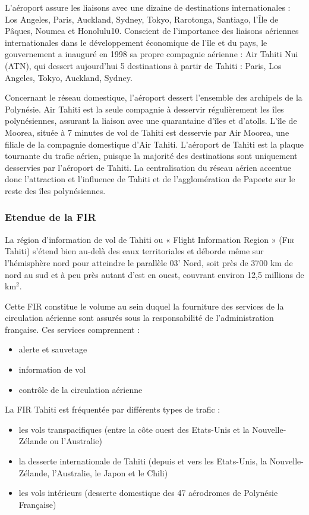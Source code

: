 L’aéroport assure les liaisons avec une dizaine de destinations internationales : Los Angeles, Paris, Auckland, Sydney, Tokyo, Rarotonga, Santiago, l’Île de Pâques, Noumea et Honolulu10. Conscient de l’importance des liaisons aériennes internationales dans le développement économique de l’île et du pays, le gouvernement a inauguré en 1998 sa propre compagnie aérienne : Air Tahiti Nui (ATN), qui dessert aujourd’hui 5 destinations à partir de Tahiti : Paris, Los Angeles, Tokyo, Auckland, Sydney.

Concernant le réseau domestique, l’aéroport dessert l’ensemble des archipels de la Polynésie. Air Tahiti est la seule compagnie à desservir régulièrement les îles polynésiennes, assurant la liaison avec une quarantaine d’îles et d’atolls. L’île de Moorea, située à 7 minutes de vol de Tahiti est desservie par Air Moorea, une filiale de la compagnie domestique d’Air Tahiti. L’aéroport de Tahiti est la plaque tournante du trafic aérien, puisque la majorité des destinations sont uniquement desservies par l’aéroport de Tahiti. La centralisation du réseau aérien accentue donc l’attraction et l’influence de Tahiti et de l’agglomération de Papeete sur le reste des îles polynésiennes.

        \subsubsection{Etendue de la \textsc{FIR}\label{Fir}}
La région d'information de vol de Tahiti ou « Flight Information Region » (\textsc{Fir} Tahiti) s'étend bien au-delà des eaux territoriales et déborde même sur l'hémisphère nord pour atteindre le parallèle 03' Nord, soit près de 3700 km de nord au sud et à peu près autant d'est en ouest, couvrant environ 12,5 millions de km$^2$.

Cette FIR constitue le volume au sein duquel la fourniture des services de la circulation aérienne sont assurés sous la responsabilité de l'administration française. Ces services comprennent :
\begin{itemize}
    \item alerte et sauvetage
    \item information de vol
    \item contrôle de la circulation aérienne
\end{itemize}\medskip
La FIR Tahiti est fréquentée par différents types de trafic :
\begin{itemize}
    \item les vols transpacifiques (entre la côte ouest des Etats-Unis et la Nouvelle-Zélande ou l'Australie)
    \item la desserte internationale de Tahiti (depuis et vers les Etats-Unis, la Nouvelle-Zélande, l'Australie, le Japon et le Chili)
    \item les vols intérieurs (desserte domestique des 47 aérodromes de Polynésie Française)
\end{itemize}\medskip


